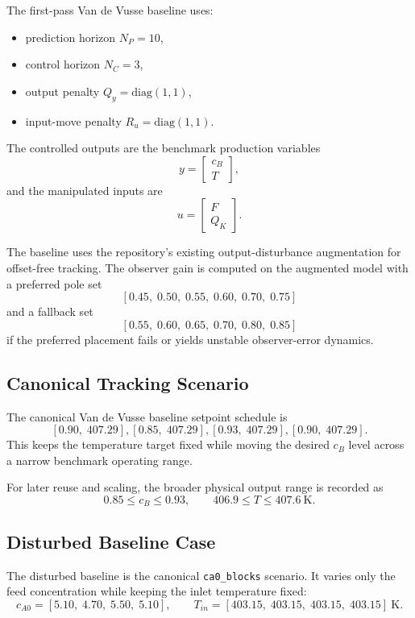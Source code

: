 The first-pass Van de Vusse baseline uses:
\begin{itemize}
    \item prediction horizon $N_P = 10$,
    \item control horizon $N_C = 3$,
    \item output penalty $Q_y = \mathrm{diag}(1, 1)$,
    \item input-move penalty $R_u = \mathrm{diag}(1, 1)$.
\end{itemize}

The controlled outputs are the benchmark production variables
\[
y = \begin{bmatrix} c_B \\ T \end{bmatrix},
\]
and the manipulated inputs are
\[
u = \begin{bmatrix} F \\ Q_K \end{bmatrix}.
\]

The baseline uses the repository's existing output-disturbance augmentation for offset-free tracking. The observer gain is computed on the augmented model with a preferred pole set
\[
[0.45,\; 0.50,\; 0.55,\; 0.60,\; 0.70,\; 0.75]
\]
and a fallback set
\[
[0.55,\; 0.60,\; 0.65,\; 0.70,\; 0.80,\; 0.85]
\]
if the preferred placement fails or yields unstable observer-error dynamics.

\subsection{Canonical Tracking Scenario}

The canonical Van de Vusse baseline setpoint schedule is
\[
[0.90,\; 407.29],
[0.85,\; 407.29],
[0.93,\; 407.29],
[0.90,\; 407.29].
\]
This keeps the temperature target fixed while moving the desired $c_B$ level across a narrow benchmark operating range.

For later reuse and scaling, the broader physical output range is recorded as
\[
0.85 \le c_B \le 0.93, \qquad 406.9 \le T \le 407.6~\mathrm{K}.
\]

\subsection{Disturbed Baseline Case}

The disturbed baseline is the canonical \texttt{ca0\_blocks} scenario. It varies only the feed concentration while keeping the inlet temperature fixed:
\[
c_{A0} = [5.10,\; 4.70,\; 5.50,\; 5.10],
\qquad
T_{in} = [403.15,\; 403.15,\; 403.15,\; 403.15]~\mathrm{K}.
\]

